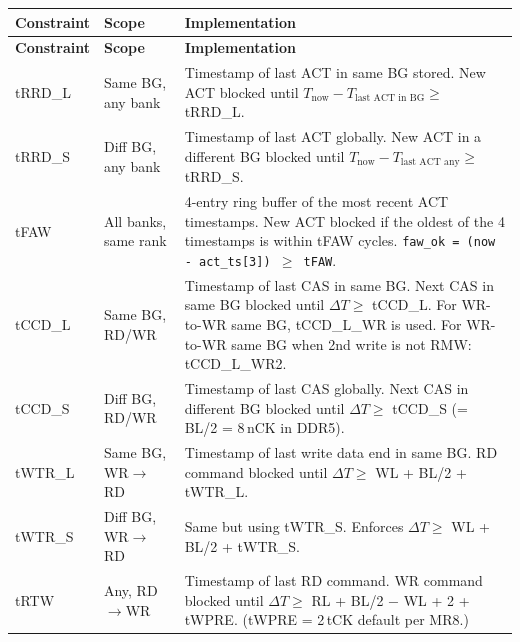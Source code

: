 \documentclass[11pt,a4paper]{article}
\begin{document}
\begin{longtable}{L{2.8cm} L{3cm} L{8.7cm}}
\toprule
\textbf{Constraint} & \textbf{Scope} & \textbf{Implementation} \\
\midrule
\endfirsthead\toprule\textbf{Constraint}&\textbf{Scope}&\textbf{Implementation}\\\midrule\endhead
\bottomrule\endfoot

tRRD\_L
  & Same BG, any bank
  & Timestamp of last ACT in same BG stored. New ACT blocked until
    $T_{\text{now}} - T_{\text{last ACT in BG}} \geq$ tRRD\_L. \\

tRRD\_S
  & Diff BG, any bank
  & Timestamp of last ACT globally. New ACT in a different BG blocked until
    $T_{\text{now}} - T_{\text{last ACT any}} \geq$ tRRD\_S. \\

tFAW
  & All banks, same rank
  & 4-entry ring buffer of the most recent ACT timestamps.
    New ACT blocked if the oldest of the 4 timestamps is within tFAW cycles.
    \texttt{faw\_ok = (now - act\_ts[3]) $\geq$ tFAW}. \\

tCCD\_L
  & Same BG, RD/WR
  & Timestamp of last CAS in same BG. Next CAS in same BG blocked until
    $\Delta T \geq$ tCCD\_L. For WR-to-WR same BG, tCCD\_L\_WR is used.
    For WR-to-WR same BG when 2nd write is not RMW: tCCD\_L\_WR2. \\

tCCD\_S
  & Diff BG, RD/WR
  & Timestamp of last CAS globally. Next CAS in different BG blocked until
    $\Delta T \geq$ tCCD\_S (= BL/2 = 8\,nCK in DDR5). \\

tWTR\_L
  & Same BG, WR$\to$RD
  & Timestamp of last write data end in same BG. RD command blocked until
    $\Delta T \geq$ WL + BL/2 + tWTR\_L. \\

tWTR\_S
  & Diff BG, WR$\to$RD
  & Same but using tWTR\_S. Enforces $\Delta T \geq$ WL + BL/2 + tWTR\_S. \\

tRTW
  & Any, RD$\to$WR
  & Timestamp of last RD command. WR command blocked until
    $\Delta T \geq$ RL + BL/2 $-$ WL + 2 + tWPRE.
    (tWPRE = 2\,tCK default per MR8.) \\
\end{longtable}

\end{document}
